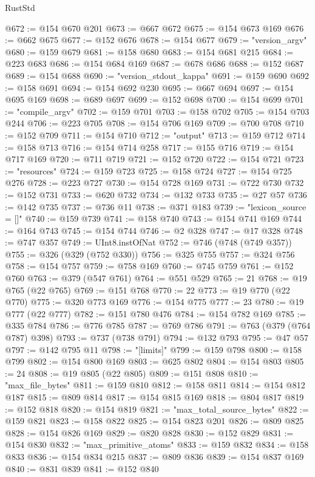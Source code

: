 \begin{lexlean}{RustStd}
\begin{coremodule}
@672 := @154 @670 @201
@673 := @667 @672
@675 := @154 @673 @169
@676 := @662 @675
@677 := @152 @676
@678 := @154 @677
@679 := "version_argv"
@680 := @159 @679
@681 := @158 @680
@683 := @154 @681 @215
@684 := @223 @683
@686 := @154 @684 @169
@687 := @678 @686
@688 := @152 @687
@689 := @154 @688
@690 := "version_stdout_kappa"
@691 := @159 @690
@692 := @158 @691
@694 := @154 @692 @230
@695 := @667 @694
@697 := @154 @695 @169
@698 := @689 @697
@699 := @152 @698
@700 := @154 @699
@701 := "compile_argv"
@702 := @159 @701
@703 := @158 @702
@705 := @154 @703 @244
@706 := @223 @705
@708 := @154 @706 @169
@709 := @700 @708
@710 := @152 @709
@711 := @154 @710
@712 := "output"
@713 := @159 @712
@714 := @158 @713
@716 := @154 @714 @258
@717 := @155 @716
@719 := @154 @717 @169
@720 := @711 @719
@721 := @152 @720
@722 := @154 @721
@723 := "resources"
@724 := @159 @723
@725 := @158 @724
@727 := @154 @725 @276
@728 := @223 @727
@730 := @154 @728 @169
@731 := @722 @730
@732 := @152 @731
@733 := @620 @732
@734 := @132 @733
@735 := @27 @57
@736 := @142 @735
@737 := @736 @11
@738 := @371 @183
@739 := "lexicon_source = []"
@740 := @159 @739
@741 := @158 @740
@743 := @154 @741 @169
@744 := @164 @743
@745 := @154 @744
@746 := @2 @328
@747 := @17 @328
@748 := @747 @357
@749 := UInt8.instOfNat
@752 := @746 (@748 (@749 @357))
@755 := @326 (@329 (@752 @330))
@756 := @325 @755
@757 := @324 @756
@758 := @154 @757
@759 := @758 @169
@760 := @745 @759
@761 := @152 @760
@763 := @379 (@547 @761)
@764 := @551 @529
@765 := 21
@768 := @19 @765 (@22 @765)
@769 := @151 @768
@770 := 22
@773 := @19 @770 (@22 @770)
@775 := @320 @773 @169
@776 := @154 @775
@777 := 23
@780 := @19 @777 (@22 @777)
@782 := @151 @780 @476
@784 := @154 @782 @169
@785 := @335 @784
@786 := @776 @785
@787 := @769 @786
@791 := @763 (@379 (@764 @787) @398)
@793 := @737 (@738 @791)
@794 := @132 @793
@795 := @47 @57
@797 := @142 @795 @11
@798 := "[limits]"
@799 := @159 @798
@800 := @158 @799
@802 := @154 @800 @169
@803 := @625 @802
@804 := @154 @803
@805 := 24
@808 := @19 @805 (@22 @805)
@809 := @151 @808
@810 := "max_file_bytes"
@811 := @159 @810
@812 := @158 @811
@814 := @154 @812 @187
@815 := @809 @814
@817 := @154 @815 @169
@818 := @804 @817
@819 := @152 @818
@820 := @154 @819
@821 := "max_total_source_bytes"
@822 := @159 @821
@823 := @158 @822
@825 := @154 @823 @201
@826 := @809 @825
@828 := @154 @826 @169
@829 := @820 @828
@830 := @152 @829
@831 := @154 @830
@832 := "max_primitive_atoms"
@833 := @159 @832
@834 := @158 @833
@836 := @154 @834 @215
@837 := @809 @836
@839 := @154 @837 @169
@840 := @831 @839
@841 := @152 @840

\end{coremodule}
\end{lexlean}
